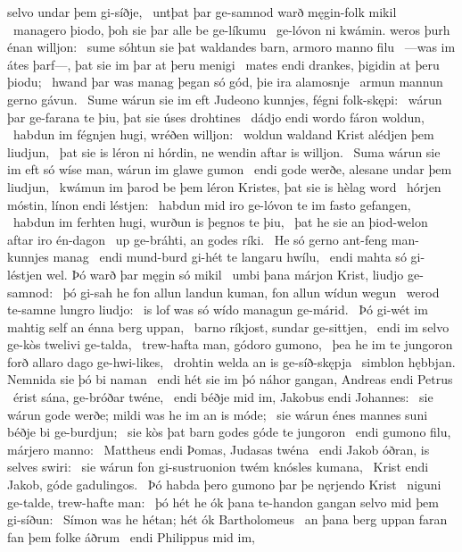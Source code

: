 selvo undar þem gi-síðje, \hld\ untþat þar ge-samnod warð
męgin-folk mikil \hld\ managero þiodo,
þoh sie þar alle be ge-líkumu \hld\ ge-lóvon ni kwámin.
weros þurh énan willjon: \hld\ sume sóhtun sie þat waldandes barn,
armoro manno filu \hld\ —was im átes þarf—,
þat sie im þar at þeru menigi \hld\ mates endi drankes,
þigidin at þeru þiodu; \hld\ hwand þar was manag þegan só gód,
þie ira alamosnje \hld\ armun mannun
gerno gávun. \hld\ Sume wárun sie im eft Judeono kunnjes,
fégni folk-skępi: \hld\ wárun þar ge-farana te þiu,
þat sie úses drohtines \hld\ dádjo endi wordo
fáron woldun, \hld\ habdun im fégnjen hugi,
wréðen willjon: \hld\ woldun waldand Krist
alédjen þem liudjun, \hld\ þat sie is léron ni hórdin,
ne wendin aftar is willjon. \hld\ Suma wárun sie im eft só wíse man,
wárun im glawe gumon \hld\ endi gode werðe,
alesane undar þem liudjun, \hld\ kwámun im þarod be þem léron Kristes,
þat sie is hèlag word \hld\ hórjen móstin,
línon endi léstjen: \hld\ habdun mid iro ge-lóvon te im
fasto gefangen, \hld\ habdun im ferhten hugi,
wurðun is þegnos te þiu, \hld\ þat he sie an þiod-welon
aftar iro én-dagon \hld\ up ge-bráhti,
an godes ríki. \hld\ He só gerno ant-feng
man-kunnjes manag \hld\ endi mund-burd gi-hét
te langaru hwílu, \hld\ endi mahta só gi-léstjen wel.
Þó warð þar męgin só mikil \hld\ umbi þana márjon Krist,
liudjo ge-samnod: \hld\ þó gi-sah he fon allun landun kuman,
fon allun wídun wegun \hld\ werod te-samne
lungro liudjo: \hld\ is lof was só wído
managun ge-márid. \hld\ Þó gi-wét im mahtig self
an énna berg uppan, \hld\ barno ríkjost,
sundar ge-sittjen, \hld\ endi im selvo ge-kòs
twelivi ge-talda, \hld\ trew-hafta man,
gódoro gumono, \hld\ þea he im te jungoron forð
allaro dago ge-hwi-likes, \hld\ drohtin welda
an is ge-síð-skępja \hld\ simblon hębbjan.
Nemnida sie þó bi naman \hld\ endi hét sie im þó náhor gangan,
Andreas endi Petrus \hld\ érist sána,
ge-bróðar twéne, \hld\ endi béðje mid im,
Jakobus endi Johannes: \hld\ sie wárun gode werðe;
mildi was he im an is móde; \hld\ sie wárun énes mannes suni
béðje bi ge-burdjun; \hld\ sie kòs þat barn godes
góde te jungoron \hld\ endi gumono filu,
márjero manno: \hld\ Mattheus endi Þomas,
Judasas twéna \hld\ endi Jakob óðran,
is selves swiri: \hld\ sie wárun fon gi-sustruonion twém
knósles kumana, \hld\ Krist endi Jakob,
góde gadulingos. \hld\ Þó habda þero gumono þar
þe nęrjendo Krist \hld\ niguni ge-talde, %
trew-hafte man: \hld\ þó hét he ók þana te-handon gangan
selvo mid þem gi-síðun: \hld\ Símon was he hétan;
hét ók Bartholomeus \hld\ an þana berg uppan
faran fan þem folke áðrum \hld\ endi Philippus mid im,
